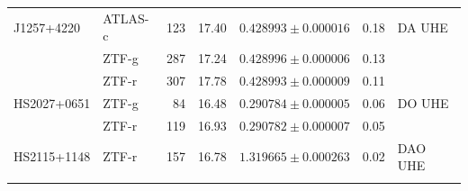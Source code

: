 \documentclass{aa}
\begin{document}
\begin{appendix}
\begin{table}
\begin{tabular}{l l r r c c l}
J1257+4220 &   ATLAS-c              & 123  & 17.40  & $0.428993\pm0.000016$ &              0.18 &DA UHE                 \\
               & ZTF-g  & 287  & 17.24  & $0.428996\pm0.000006$ & 0.13 &  \\
               & ZTF-r  & 307  & 17.78  & $0.428993\pm0.000009$ & 0.11 &  \\
\noalign{\smallskip}
HS2027+0651 & ZTF-g  &  84  & 16.48  & $0.290784\pm0.000005$ & 0.06 &  DO UHE \\
            & ZTF-r  & 119  & 16.93  & $0.290782\pm0.000007$ & 0.05 &  \\
\noalign{\smallskip}
HS2115+1148 & ZTF-r  & 157  & 16.78  & $1.319665\pm0.000263$ & 0.02 &   DAO UHE\\
\hline
\noalign{\smallskip}
\end{tabular}
\end{table}
 

\end{appendix}
\end{document}

